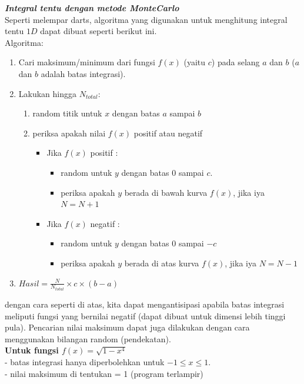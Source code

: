 \documentclass[paper=a4, fontsize=11pt]{scrartcl}
\numberwithin{equation}{section} %
\numberwithin{figure}{section} %
\numberwithin{table}{section} %
\begin{document}
\textit{\textbf{Integral tentu dengan metode MonteCarlo}}\\
Seperti melempar darts, algoritma yang digunakan untuk menghitung integral tentu $1D$ dapat dibuat seperti berikut ini.\\
Algoritma:
\begin{enumerate}
\item Cari maksimum/minimum dari fungsi $f(x)$ (yaitu $c$) pada selang $a$ dan $b$ ($a$ dan $b$ adalah batas integrasi).
\item Lakukan hingga $N_{total}$:
	\begin{enumerate}
		\item random titik untuk $x$ dengan batas $a$ sampai $b$
		\item periksa apakah nilai $f(x)$ positif atau negatif
		\begin{itemize}
			\item Jika $f(x)$ positif :
			\begin{itemize}
				\item random untuk $y$ dengan batas $0$ sampai $c$.
				\item periksa apakah $y$ berada di bawah kurva $f(x)$, jika iya $N = N+1$
			\end{itemize}
			\item Jika $f(x)$ negatif :
			\begin{itemize}
				\item random untuk $y$ dengan batas $0$ sampai $-c$
				\item periksa apakah $y$ berada di atas kurva $f(x)$, jika iya $N = N-1$
			\end{itemize}
		\end{itemize}
	\end{enumerate}
\item $Hasil = \frac{N}{N_{total}} \times c \times (b-a)$
\end{enumerate}
dengan cara seperti di atas, kita dapat mengantisipasi apabila batas integrasi meliputi fungsi yang bernilai negatif (dapat dibuat untuk dimensi lebih tinggi pula). Pencarian nilai maksimum dapat juga dilakukan dengan cara menggunakan bilangan random (pendekatan).\\

\textbf{Untuk fungsi $f(x) = \sqrt{1-x^{4}}$}\\
- batas integrasi hanya diperbolehkan untuk $-1 \leq x \leq 1$.\\
- nilai maksimum di tentukan = 1 (program terlampir)\\
\end{document}
